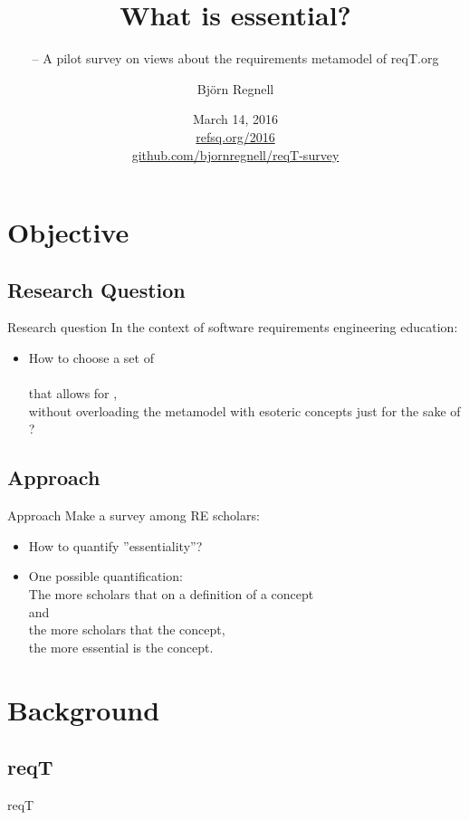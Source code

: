 \documentclass{slides}
\title[What is essential?]{What is essential?}
\subtitle{\footnotesize -- A pilot survey on views about the requirements metamodel of reqT.org}
\author{Björn Regnell}
\institute{Lund University}
\date{March 14, 2016\\ \href{http://refsq.org/2016}{refsq.org/2016}\\ \href{https://github.com/bjornregnell/reqT-survey}{github.com/bjornregnell/reqT-survey}}
\begin{document}
\frame{\titlepage}
\frame{\tableofcontents}

\section{Objective}
\subsection{Research Question}
\begin{Slide}{Research question}
In the context of software requirements engineering education:
\begin{itemize}
\item How to choose a set of \\  \\ that allows for , \\ without overloading the metamodel with esoteric concepts just for the sake of ?
\end{itemize}
\end{Slide}
\subsection{Approach}
\begin{Slide}{Approach}
Make a survey among RE scholars:
\begin{itemize}
\item How to quantify ''essentiality''?
\pause
\item One possible quantification: \\ The more scholars that  on a definition of a concept \\ and \\ the more scholars that  the concept, \\ the more essential is the concept.
\end{itemize}
\end{Slide}

\section{Background}
\subsection{reqT}
\begin{Slide}{reqT}
\end{Slide}
\end{document}
